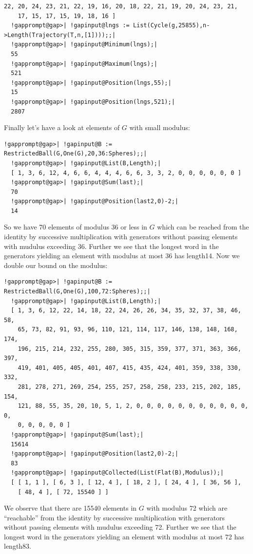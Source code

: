 \documentclass[a4paper,11pt]{report}
\begin{document}
{{\begin{Verbatim}[commandchars=!@|,fontsize=\small,frame=single,label=Example]
    22, 20, 24, 23, 21, 22, 19, 16, 20, 18, 22, 21, 19, 20, 24, 23, 21, 
    17, 15, 17, 15, 19, 18, 16 ]
  !gapprompt@gap>| !gapinput@lngs := List(Cycle(g,25855),n->Length(Trajectory(T,n,[1])));;|
  !gapprompt@gap>| !gapinput@Minimum(lngs);|
  55
  !gapprompt@gap>| !gapinput@Maximum(lngs);|
  521
  !gapprompt@gap>| !gapinput@Position(lngs,55);|
  15
  !gapprompt@gap>| !gapinput@Position(lngs,521);|
  2807
\end{Verbatim}
 Finally let's have a look at elements of $G$ with small modulus: 
\begin{Verbatim}[commandchars=!@|,fontsize=\small,frame=single,label=Example]
  !gapprompt@gap>| !gapinput@B := RestrictedBall(G,One(G),20,36:Spheres);;|
  !gapprompt@gap>| !gapinput@List(B,Length);|
  [ 1, 3, 6, 12, 4, 6, 6, 4, 4, 4, 6, 6, 3, 3, 2, 0, 0, 0, 0, 0, 0 ]
  !gapprompt@gap>| !gapinput@Sum(last);|
  70
  !gapprompt@gap>| !gapinput@Position(last2,0)-2;|
  14
\end{Verbatim}
 So we have 70 elements of modulus 36 or less in $G$ which can be reached from the identity by successive multiplication with
generators without passing elements with mudulus exceeding 36. Further we see
that the longest word in the generators yielding an element with modulus at
most 36 has length{\nobreakspace}14. Now we double our bound on the modulus: 
\begin{Verbatim}[commandchars=!@|,fontsize=\small,frame=single,label=Example]
  !gapprompt@gap>| !gapinput@B := RestrictedBall(G,One(G),100,72:Spheres);;|
  !gapprompt@gap>| !gapinput@List(B,Length);|
  [ 1, 3, 6, 12, 22, 14, 18, 22, 24, 26, 26, 34, 35, 32, 37, 38, 46, 58, 
    65, 73, 82, 91, 93, 96, 110, 121, 114, 117, 146, 138, 148, 168, 174, 
    196, 215, 214, 232, 255, 280, 305, 315, 359, 377, 371, 363, 366, 397, 
    419, 401, 405, 405, 401, 407, 415, 435, 424, 401, 359, 338, 330, 332, 
    281, 278, 271, 269, 254, 255, 257, 258, 258, 233, 215, 202, 185, 154, 
    121, 88, 55, 35, 20, 10, 5, 1, 2, 0, 0, 0, 0, 0, 0, 0, 0, 0, 0, 0, 0, 
    0, 0, 0, 0, 0 ]
  !gapprompt@gap>| !gapinput@Sum(last);|
  15614
  !gapprompt@gap>| !gapinput@Position(last2,0)-2;|
  83
  !gapprompt@gap>| !gapinput@Collected(List(Flat(B),Modulus));|
  [ [ 1, 1 ], [ 6, 3 ], [ 12, 4 ], [ 18, 2 ], [ 24, 4 ], [ 36, 56 ], 
    [ 48, 4 ], [ 72, 15540 ] ]
\end{Verbatim}
 We observe that there are 15540 elements in $G$ with modulus 72 which are ``reachable'' from the identity by successive multiplication with generators without passing
elements with mudulus exceeding 72. Further we see that the longest word in
the generators yielding an element with modulus at most 72 has
length{\nobreakspace}83. 

}}
\end{document}
